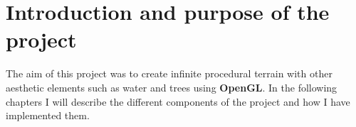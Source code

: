 \section{Introduction and purpose of the project}
The aim of this project was to create infinite procedural terrain with other aesthetic elements such as water and trees using \textbf{OpenGL}.
In the following chapters I will describe the different components of the project and how I have implemented them.
\newpage